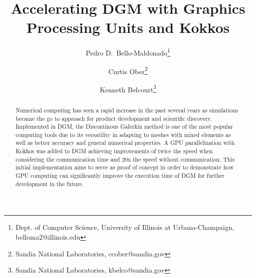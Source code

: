\documentclass{ccr16}
\title{Accelerating DGM with Graphics Processing Units and Kokkos}
\author
{
    Pedro D.\ Bello-Maldonado\thanks{Dept. of Computer Science, University of Illinois at Urbana-Champaign, belloma2@illinois.edu} \and Curtis Ober\thanks{Sandia National Laboratories, ccober@sandia.gov} \and Kenneth Belcourt\thanks{Sandia National Laboratories, kbelco@sandia.gov}
}
\begin{document}
    \maketitle

    \begin{abstract}
        Numerical computing has seen a rapid increase in the past several years as simulations became the go to approach for product development and scientific discovery. Implemented in DGM, the Discontinous Galerkin method is one of the most popular computing tools due to its versatility in adapting to meshes with mixed elements as well as better accuracy and general numerical properties. A GPU parallelization with Kokkos was added to DGM achieving improvements of twice the speed when considering the communication time and 20x the speed without communication. This initial implementation aims to serve as proof of concept in order to demonstrate how GPU computing can significantly improve the execution time of DGM for further development in the future.
    \end{abstract}
\end{document}
